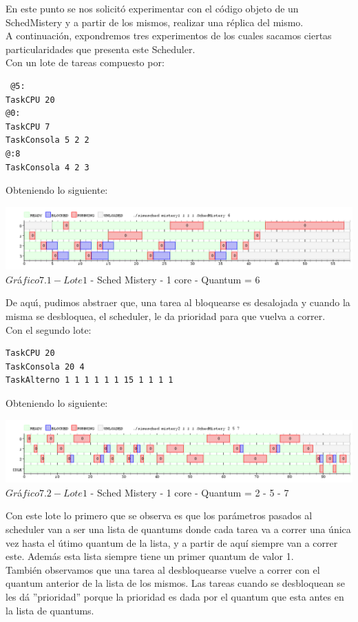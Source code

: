 \indent En este punto se nos solicit\'{o} experimentar con el c\'{o}digo objeto de un 
SchedMistery y a partir de los mismos, realizar una r\'{e}plica del mismo.\\

A continuaci\'{o}n, expondremos tres experimentos de los cuales sacamos ciertas particularidades que presenta este Scheduler.\\

Con un lote de tareas compuesto por:\\

\begin{verbatim}
 @5:
TaskCPU 20
@0:
TaskCPU 7
TaskConsola 5 2 2
@:8
TaskConsola 4 2 3
\end{verbatim}

Obteniendo lo siguiente:
\begin{center}
    	\includegraphics[width=450pt]{./Test/ej7_1.png}
	{$Gr$\'a$fico 7.1 - Lote 1$ - Sched Mistery - 1 core - Quantum = 6}	
 \end{center}
 
De aqu\'{\i}, pudimos abstraer que, una tarea al bloquearse es desalojada y cuando la misma se desbloquea, el scheduler, le da 
prioridad para que vuelva a correr.\\

Con el segundo lote:\\

\begin{verbatim}
TaskCPU 20
TaskConsola 20 4
TaskAlterno 1 1 1 1 1 1 15 1 1 1 1
\end{verbatim}

Obteniendo lo siguiente:
\begin{center}
    	\includegraphics[width=450pt]{./Test/ej7_2.png}
	{$Gr$\'a$fico 7.2 - Lote 1$ - Sched Mistery - 1 core - Quantum = 2 - 5 - 7}	
 \end{center}

Con este lote lo primero que se observa es que los par\'{a}metros pasados al scheduler van a ser una lista de quantums 
donde cada tarea va a correr una \'{u}nica vez hasta el \'{u}timo quantum de la lista, y a partir de aquí siempre van a correr este. Adem\'{a}s esta lista siempre 
tiene un primer quantum de valor 1.\\
Tambi\'{e}n observamos que una tarea al desbloquearse vuelve a correr con el quantum anterior de la lista de los mismos. 
Las tareas cuando se desbloquean se les d\'{a} ''prioridad'' porque la prioridad es dada por el quantum que esta antes en 
la lista de quantums.\\

